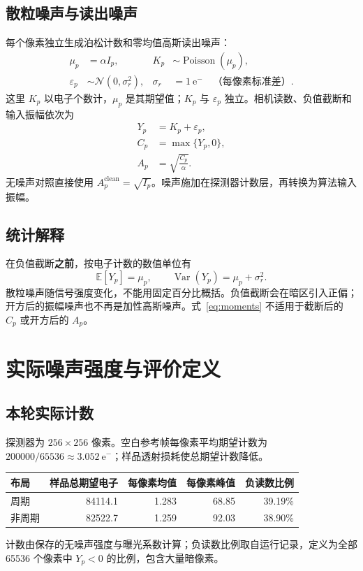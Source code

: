 \documentclass[UTF8,a4paper,11pt,fontset=fandol]{ctexart}
\newcommand{\electron}{\mathrm{e}^{-}}
\begin{document}
\subsection*{散粒噪声与读出噪声}
每个像素独立生成泊松计数和零均值高斯读出噪声：
\begin{align}
\mu_p&=\alpha I_p, & K_p&\sim\operatorname{Poisson}(\mu_p),\label{eq:poisson}\\
\varepsilon_p&\sim\mathcal N(0,\sigma_r^2), &\sigma_r&=1\ \electron\quad\text{（每像素标准差）}.\label{eq:read}
\end{align}
这里 $K_p$ 以电子个数计，$\mu_p$ 是其期望值；$K_p$ 与 $\varepsilon_p$ 独立。相机读数、负值截断和输入振幅依次为
\begin{align}
Y_p&=K_p+\varepsilon_p,\label{eq:readout}\\
C_p&=\max\{Y_p,0\},\label{eq:clip}\\
A_p&=\sqrt{\frac{C_p}{\alpha}}.\label{eq:amplitude}
\end{align}
无噪声对照直接使用 $A_p^{\mathrm{clean}}=\sqrt{I_p}$。噪声施加在探测器计数层，再转换为算法输入振幅。
\subsection*{统计解释}
在负值截断\textbf{之前}，按电子计数的数值单位有
\begin{equation}
\mathbb E[Y_p]=\mu_p,\qquad
\operatorname{Var}(Y_p)=\mu_p+\sigma_r^2.
\label{eq:moments}
\end{equation}
散粒噪声随信号强度变化，不能用固定百分比概括。负值截断会在暗区引入正偏；开方后的振幅噪声也不再是加性高斯噪声。式~\eqref{eq:moments} 不适用于截断后的 $C_p$ 或开方后的 $A_p$。

\clearpage\section*{实际噪声强度与评价定义}\label{sec:metrics}
\subsection*{本轮实际计数}
探测器为 $256\times256$ 像素。空白参考帧每像素平均期望计数为 $200000/65536\approx3.052\ \electron$；样品透射损耗使总期望计数降低。
\begin{center}\small
\begin{tabular}{lrrrr}\toprule
布局 & 样品总期望电子 & 每像素均值 & 每像素峰值 & 负读数比例\\\midrule
周期 & 84114.1 & 1.283 & 68.85 & 39.19\%\\
非周期 & 82522.7 & 1.259 & 92.03 & 38.90\%\\\bottomrule
\end{tabular}\end{center}
计数由保存的无噪声强度与曝光系数计算；负读数比例取自运行记录，定义为全部 65536 个像素中 $Y_p<0$ 的比例，包含大量暗像素。
\end{document}
